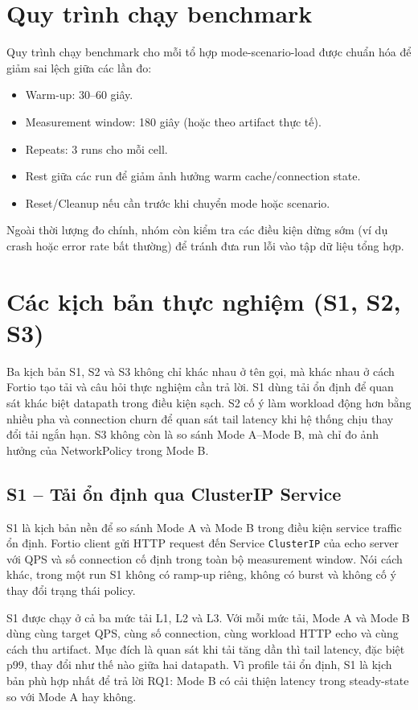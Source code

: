 \section{Quy trình chạy benchmark}
\label{sec:run-protocol}

Quy trình chạy benchmark cho mỗi tổ hợp mode-scenario-load được chuẩn hóa để giảm sai lệch giữa các lần đo:
\begin{itemize}
  \item Warm-up: 30--60 giây.
  \item Measurement window: 180 giây (hoặc theo artifact thực tế).
  \item Repeats: 3 runs cho mỗi cell.
  \item Rest giữa các run để giảm ảnh hưởng warm cache/connection state.
  \item Reset/Cleanup nếu cần trước khi chuyển mode hoặc scenario.
\end{itemize}

Ngoài thời lượng đo chính, nhóm còn kiểm tra các điều kiện dừng sớm (ví dụ crash hoặc error rate bất thường) để tránh đưa run lỗi vào tập dữ liệu tổng hợp.

\section{Các kịch bản thực nghiệm (S1, S2, S3)}
\label{sec:scenarios}

Ba kịch bản S1, S2 và S3 không chỉ khác nhau ở tên gọi, mà khác nhau ở cách Fortio tạo tải và câu hỏi thực nghiệm cần trả lời. S1 dùng tải ổn định để quan sát khác biệt datapath trong điều kiện sạch. S2 cố ý làm workload động hơn bằng nhiều pha và connection churn để quan sát tail latency khi hệ thống chịu thay đổi tải ngắn hạn. S3 không còn là so sánh Mode A--Mode B, mà chỉ đo ảnh hưởng của NetworkPolicy trong Mode B.

\subsection{S1 -- Tải ổn định qua ClusterIP Service}

S1 là kịch bản nền để so sánh Mode A và Mode B trong điều kiện service traffic ổn định. Fortio client gửi HTTP request đến Service \texttt{ClusterIP} của echo server với QPS và số connection cố định trong toàn bộ measurement window. Nói cách khác, trong một run S1 không có ramp-up riêng, không có burst và không cố ý thay đổi trạng thái policy.

S1 được chạy ở cả ba mức tải L1, L2 và L3. Với mỗi mức tải, Mode A và Mode B dùng cùng target QPS, cùng số connection, cùng workload HTTP echo và cùng cách thu artifact. Mục đích là quan sát khi tải tăng dần thì tail latency, đặc biệt p99, thay đổi như thế nào giữa hai datapath. Vì profile tải ổn định, S1 là kịch bản phù hợp nhất để trả lời RQ1: Mode B có cải thiện latency trong steady-state so với Mode A hay không.

